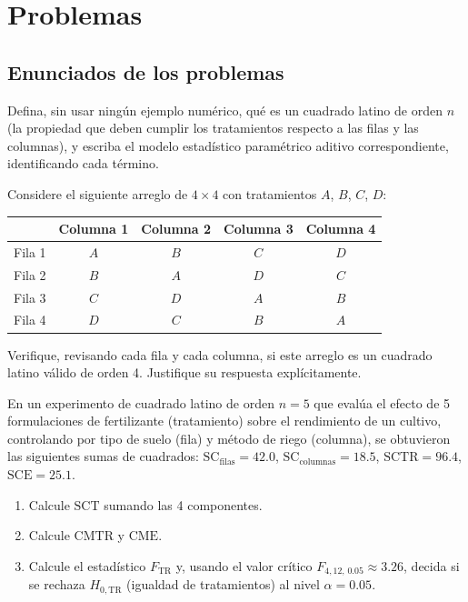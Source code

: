 \section*{Problemas}

\subsection*{Enunciados de los problemas}

\begin{problema}
	\label{prob:e90018f}
	Defina, sin usar ningún ejemplo numérico, qué es un cuadrado latino de orden $n$ (la propiedad que deben cumplir los tratamientos respecto a las filas y las columnas), y escriba el modelo estadístico paramétrico aditivo correspondiente, identificando cada término.
\end{problema}

\begin{problema}
	\label{prob:8e9e6f8}
	Considere el siguiente arreglo de $4 \times 4$ con tratamientos $A$, $B$, $C$, $D$:
	\begin{center}
		\begin{tabular}{c|cccc}
			 & Columna 1 & Columna 2 & Columna 3 & Columna 4 \\ \hline
			Fila 1 & $A$ & $B$ & $C$ & $D$ \\
			Fila 2 & $B$ & $A$ & $D$ & $C$ \\
			Fila 3 & $C$ & $D$ & $A$ & $B$ \\
			Fila 4 & $D$ & $C$ & $B$ & $A$ \\
		\end{tabular}
	\end{center}
	Verifique, revisando cada fila y cada columna, si este arreglo es un cuadrado latino válido de orden 4. Justifique su respuesta explícitamente.
\end{problema}

\begin{problema}
	\label{prob:f64d8dc}
	En un experimento de cuadrado latino de orden $n = 5$ que evalúa el efecto de 5 formulaciones de fertilizante (tratamiento) sobre el rendimiento de un cultivo, controlando por tipo de suelo (fila) y método de riego (columna), se obtuvieron las siguientes sumas de cuadrados: $\text{SC}_{\text{filas}} = 42.0$, $\text{SC}_{\text{columnas}} = 18.5$, $\text{SCTR} = 96.4$, $\text{SCE} = 25.1$.
	\begin{enumerate}
		\item Calcule $\text{SCT}$ sumando las 4 componentes.
		\item Calcule $\text{CMTR}$ y $\text{CME}$.
		\item Calcule el estadístico $F_{\text{TR}}$ y, usando el valor crítico $F_{4,12,\,0.05} \approx 3.26$, decida si se rechaza $H_{0,\text{TR}}$ (igualdad de tratamientos) al nivel $\alpha = 0.05$.
	\end{enumerate}
\end{problema}

